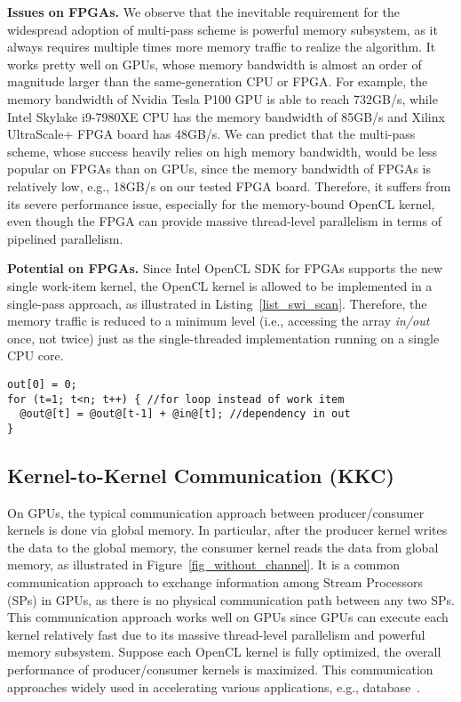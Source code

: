 {\bf Issues on FPGAs. }We observe that the inevitable requirement for the widespread adoption of multi-pass scheme is powerful memory subsystem, as it always requires multiple times more memory traffic to realize the algorithm. It works pretty well on GPUs, whose memory bandwidth is almost an order of magnitude larger than the same-generation CPU or FPGA. For example, the memory bandwidth of Nvidia Tesla P100 GPU is able to reach 732GB/s, while Intel Skylake i9-7980XE CPU has the memory bandwidth of 85GB/s and Xilinx UltraScale+ FPGA board has 48GB/s. We can predict that the multi-pass scheme, whose success heavily relies on high memory bandwidth, would be less popular on FPGAs than on GPUs, since the memory bandwidth of FPGAs is relatively low, e.g., 18GB/s on our tested FPGA board. Therefore, it suffers from its severe performance issue, especially for the memory-bound OpenCL kernel, even though the FPGA can provide massive thread-level parallelism in terms of pipelined parallelism. 

{\bf Potential on FPGAs. } Since Intel OpenCL SDK for FPGAs supports the new single work-item kernel, the OpenCL kernel is allowed to be implemented in a single-pass approach, as illustrated in Listing~\ref{list_swi_scan}. %
Therefore, the memory traffic is reduced to a minimum level (i.e., accessing the array \emph{in/out} once, not twice) just as the single-threaded implementation running on a single CPU core. 
\begin{lstlisting}[caption={SWI-based prefix sum},label={list_swi_scan},captionpos=b]
out[0] = 0;
for (t=1; t<n; t++) { //for loop instead of work item
  @out@[t] = @out@[t-1] + @in@[t]; //dependency in out
}
\end{lstlisting}



\vspace{-1ex}
\subsection{Kernel-to-Kernel Communication (KKC)}
On GPUs, the typical communication approach between producer/consumer kernels is done via global memory. In particular, after the producer kernel writes the data to the global memory, the consumer kernel reads the data from global memory, as illustrated in Figure~\ref{fig_without_channel}. It is a common communication approach to exchange information among Stream Processors (SPs) in GPUs, as there is no physical communication path between any two SPs. This communication approach works well on GPUs since GPUs can execute each kernel relatively fast due to its massive thread-level parallelism and powerful memory subsystem. Suppose each OpenCL kernel is fully optimized, the overall performance of producer/consumer kernels is maximized. %
This communication approaches widely used in accelerating various applications, e.g., database~\cite{query_gpu_tods09, omnidb_vldb13}. 

